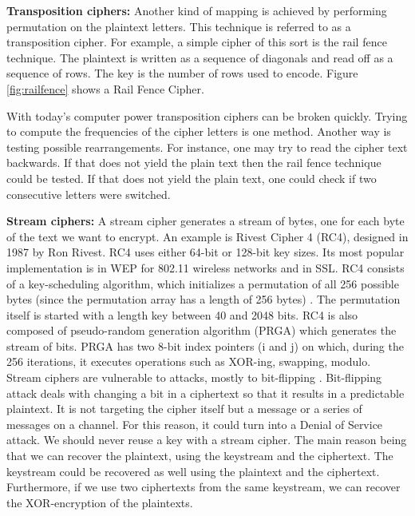 \textbf{Transposition ciphers:} Another kind of mapping is achieved by performing permutation on the plaintext letters. This technique is referred to as a transposition cipher. For example, a simple cipher of this sort is the rail fence technique. The plaintext is written as a sequence of diagonals and read off as a sequence of rows. The key is the number of rows used to encode. Figure \ref{fig:railfence} shows a Rail Fence Cipher.

With today's computer power transposition ciphers can be broken quickly. Trying to compute the frequencies of the cipher letters is one method. Another way is testing possible rearrangements. For instance, one may try to read the cipher text backwards. If that does not yield the plain text then the rail fence technique could be tested. If that does not yield the plain text, one could check if two consecutive letters were switched.    

\textbf{Stream ciphers:} A stream cipher generates a stream of bytes, one for each byte of the text we want to encrypt.  An example is Rivest Cipher 4 (RC4), designed in 1987 by Ron Rivest. RC4 uses either 64-bit or 128-bit key sizes. Its most popular implementation is in WEP for 802.11 wireless networks and in SSL. RC4 consists of a key-scheduling algorithm, which initializes a permutation of all 256 possible bytes (since the permutation array has a length of 256 bytes) \cite{stallings2017}. The permutation itself is started with a length key between 40 and 2048 bits. RC4 is also composed of pseudo-random generation algorithm (PRGA) which generates the stream of bits. PRGA has two 8-bit index pointers (i and j) on which, during the 256 iterations, it executes operations such as XOR-ing, swapping, modulo. Stream ciphers are vulnerable to attacks, mostly to bit-flipping \cite{wikirc4} . Bit-flipping attack deals with changing a bit in a ciphertext so that it results in a predictable plaintext. It is not targeting the cipher itself but a message or a series of messages on a channel. For this reason, it could turn into a Denial of Service attack. We should never reuse a key with a stream cipher. The main reason being that we can recover the plaintext, using the keystream and the ciphertext. The keystream could be recovered as well using the plaintext and the ciphertext. Furthermore, if we use two ciphertexts from the same keystream, we can recover the XOR-encryption of the plaintexts.

